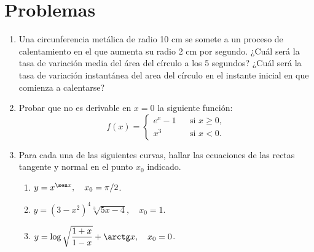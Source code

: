 \documentclass[a4paper]{article}
\begin{document}
\section*{Problemas}
\begin{enumerate}[leftmargin=*]

\item Una circunferencia metálica de radio 10 cm  se somete a un proceso de calentamiento en el que aumenta su radio 2 cm por segundo. ¿Cuál será la tasa de variación media del área del círculo a los 5 segundos? ¿Cuál será la tasa de variación instantánea del area del círculo en el instante inicial en que comienza a calentarse?

\item  Probar que no es derivable en $x=0$ la siguiente función:
\[ f(x)=\left\{
\begin{array}{ccl}
    e^x-1 &  & \mbox{si } x\geq 0,  \\
    x^3 &  & \mbox{si } x<0.
\end{array}\right.
\]

\item  Para cada una de las siguientes curvas, hallar las ecuaciones
de las rectas tangente y normal en el punto $x_{0}$ indicado.
\begin{enumerate}
    \item  $y=x^{\sen x},\quad x_{0}=\pi/2$.

    \item  $y=(3-x^2)^4\sqrt[3]{5x-4},\quad x_{0}=1$.

    \item  $y=\log \sqrt{\dfrac{1+x}{1-x}}+\arctg x, \quad x_{0}=0$.
\end{enumerate}

\end{enumerate}
\end{document}
